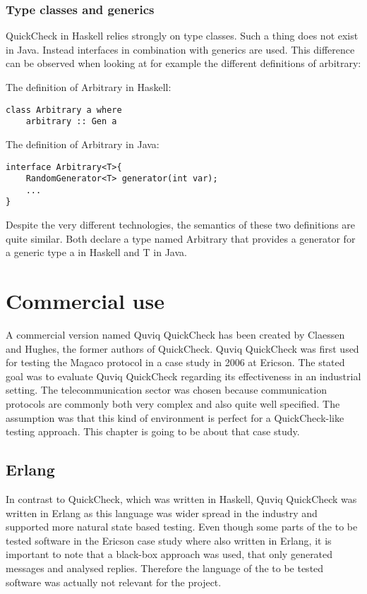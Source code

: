 \documentclass[a4paper, 12pt]{article} %
\begin{document}
\subsubsection{Type classes and generics}

QuickCheck in Haskell relies strongly on type classes. Such a thing does not exist in Java. Instead interfaces in combination with generics are used. This difference can be observed when looking at for example the different definitions of arbitrary:

The definition of Arbitrary in Haskell:

\begin{verbatim}
class Arbitrary a where
    arbitrary :: Gen a
\end{verbatim}

The definition of Arbitrary in Java:

\begin{verbatim}
interface Arbitrary<T>{
    RandomGenerator<T> generator(int var);
    ...
}
\end{verbatim}

Despite the very different technologies, the semantics of these two definitions are quite similar. Both declare a type named Arbitrary that provides a generator for a generic type a in Haskell and T in Java.

\newpage
\section{Commercial use}

A commercial version named Quviq QuickCheck has been created by Claessen and Hughes, the former authors of QuickCheck. Quviq QuickCheck was first used for testing the Magaco protocol in a case study in 2006 at Ericson. The stated goal was to evaluate Quviq QuickCheck regarding its effectiveness in an industrial setting. The telecommunication sector was chosen because communication protocols are commonly both very complex and also quite well specified. The assumption was that this kind of environment is perfect for a QuickCheck-like testing approach. This chapter is going to be about that case study\cite{Arts06}.

\subsection{Erlang}

In contrast to QuickCheck, which was written in Haskell, Quviq QuickCheck was written in Erlang as this language was wider spread in the industry and supported more natural state based testing. Even though some parts of the to be tested software in the Ericson case study where also written in Erlang, it is important to note that a black-box approach was used, that only generated messages and analysed replies. Therefore the language of the to be tested software was actually not relevant for the project\cite{Arts06}. 
\end{document}
